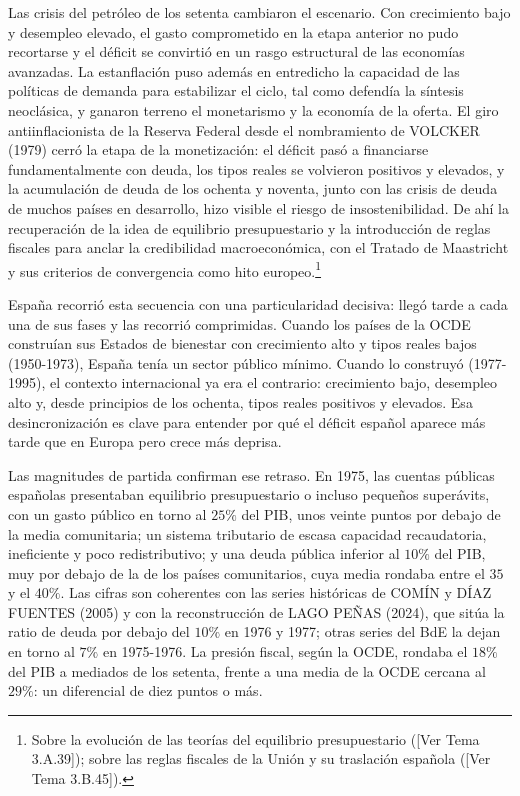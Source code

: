 \documentclass[10pt,a4paper]{article}
\newcommand{\authorfont}[1]{{\fontfamily{EBGaramond-TLF}\selectfont #1}}
\begin{document}
Las crisis del petróleo de los setenta cambiaron el escenario. Con crecimiento bajo y desempleo elevado, el gasto comprometido en la etapa anterior no pudo recortarse y el déficit se convirtió en un rasgo estructural de las economías avanzadas. La estanflación puso además en entredicho la capacidad de las políticas de demanda para estabilizar el ciclo, tal como defendía la síntesis neoclásica, y ganaron terreno el monetarismo y la economía de la oferta. El giro antiinflacionista de la Reserva Federal desde el nombramiento de VOLCKER (1979) cerró la etapa de la monetización: el déficit pasó a financiarse fundamentalmente con deuda, los tipos reales se volvieron positivos y elevados, y la acumulación de deuda de los ochenta y noventa, junto con las crisis de deuda de muchos países en desarrollo, hizo visible el riesgo de insostenibilidad. De ahí la recuperación de la idea de equilibrio presupuestario y la introducción de reglas fiscales para anclar la credibilidad macroeconómica, con el Tratado de Maastricht y sus criterios de convergencia como hito europeo.\footnote{Sobre la evolución de las teorías del equilibrio presupuestario ([\authorfont{Ver Tema 3.A.39}]); sobre las reglas fiscales de la Unión y su traslación española ([\authorfont{Ver Tema 3.B.45}]).
}

España recorrió esta secuencia con una particularidad decisiva: llegó tarde a cada una de sus fases y las recorrió comprimidas. Cuando los países de la OCDE construían sus Estados de bienestar con crecimiento alto y tipos reales bajos (1950-1973), España tenía un sector público mínimo. Cuando lo construyó (1977-1995), el contexto internacional ya era el contrario: crecimiento bajo, desempleo alto y, desde principios de los ochenta, tipos reales positivos y elevados. Esa desincronización es clave para entender por qué el déficit español aparece más tarde que en Europa pero crece más deprisa.

Las magnitudes de partida confirman ese retraso. En 1975, las cuentas públicas españolas presentaban equilibrio presupuestario o incluso pequeños superávits, con un gasto público en torno al $25\%$ del PIB, unos veinte puntos por debajo de la media comunitaria; un sistema tributario de escasa capacidad recaudatoria, ineficiente y poco redistributivo; y una deuda pública inferior al $10\%$ del PIB, muy por debajo de la de los países comunitarios, cuya media rondaba entre el $35$ y el $40\%$. Las cifras son coherentes con las series históricas de COMÍN y DÍAZ FUENTES (2005) y con la reconstrucción de LAGO PEÑAS (2024), que sitúa la ratio de deuda por debajo del $10\%$ en 1976 y 1977; otras series del BdE la dejan en torno al $7\%$ en 1975-1976. La presión fiscal, según la OCDE, rondaba el $18\%$ del PIB a mediados de los setenta, frente a una media de la OCDE cercana al $29\%$: un diferencial de diez puntos o más.
\end{document}
